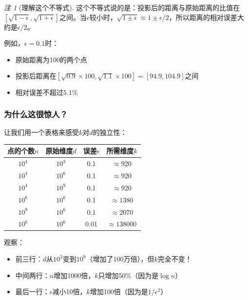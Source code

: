 \documentclass[11pt,a4paper]{ctexart}
\theoremstyle{definition}
\theoremstyle{remark}
\newtheorem{remark}[theorem]{注}
\begin{document}
\begin{remark}[理解这个不等式]
这个不等式说的是：投影后的距离与原始距离的比值在$[\sqrt{1-\epsilon}, \sqrt{1+\epsilon}]$之间。当$\epsilon$较小时，$\sqrt{1\pm\epsilon} \approx 1 \pm \epsilon/2$，所以距离的相对误差大约是$\epsilon/2$。

例如，$\epsilon = 0.1$时：
\begin{itemize}
    \item 原始距离为100的两个点
    \item 投影后距离在$[\sqrt{0.9} \times 100, \sqrt{1.1} \times 100] = [94.9, 104.9]$之间
    \item 相对误差不超过5.1\%
\end{itemize}
\end{remark}

\subsubsection{为什么这很惊人？}

让我们用一个表格来感受$k$对$d$的独立性：

\begin{center}
\begin{tabular}{|c|c|c|c|}
\hline
点的个数$n$ & 原始维度$d$ & 误差$\epsilon$ & 所需维度$k$ \\
\hline
$10^4$ & $10^3$ & 0.1 & $\approx 920$ \\
$10^4$ & $10^6$ & 0.1 & $\approx 920$ \\
$10^4$ & $10^9$ & 0.1 & $\approx 920$ \\
\hline
$10^6$ & $10^6$ & 0.1 & $\approx 1380$ \\
$10^9$ & $10^6$ & 0.1 & $\approx 2070$ \\
\hline
$10^6$ & $10^6$ & 0.01 & $\approx 138000$ \\
\hline
\end{tabular}
\end{center}

观察：
\begin{itemize}
    \item 前三行：$d$从$10^3$变到$10^9$（增加了100万倍），但$k$完全不变！
    \item 中间两行：$n$增加1000倍，$k$只增加50\%（因为是$\log n$）
    \item 最后一行：$\epsilon$减小10倍，$k$增加100倍（因为是$1/\epsilon^2$）
\end{itemize}


\end{document}
